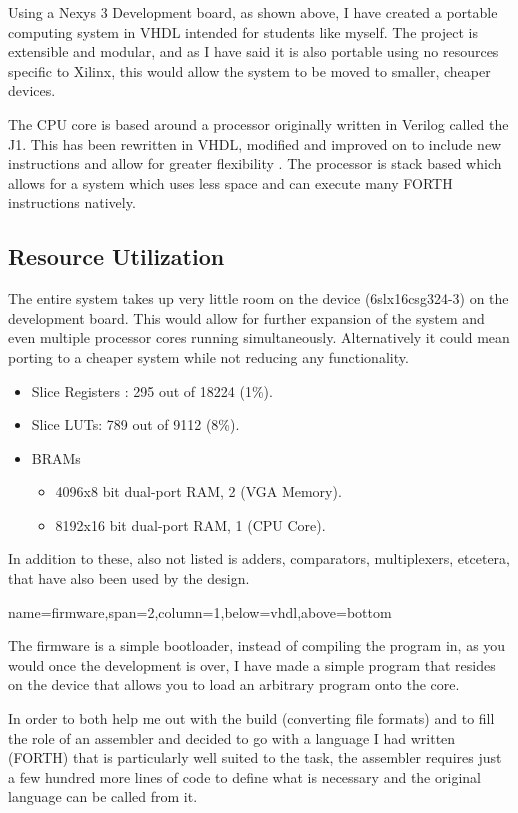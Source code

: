 \documentclass[a1paper,portrait]{baposter}
\begin{document}
\begin{poster}
{Using a Nexys 3 Development board\cite{nexysDigilent}, as shown above,
I have created a portable computing system in VHDL intended for students
like myself. The project is extensible and modular, and as I have said
it is also portable using no resources specific to Xilinx, this would
allow the system to be moved to smaller, cheaper devices.

The CPU core is based around a processor originally written in Verilog
called the J1\cite{j1core}. This has been rewritten in VHDL, modified
and improved on to include new instructions and allow for greater
flexibility . The processor is stack based which allows for a system which uses
less space and can execute many FORTH instructions natively.

\subsection{Resource Utilization}
The entire system takes up very little room on the device (6slx16csg324-3)
on the development board. This would allow for further expansion of
the system and even multiple processor cores running simultaneously. Alternatively
it could mean porting to a cheaper system while not reducing any functionality.
\begin{center}
    \begin{itemize}
        \item Slice Registers : 295 out of 18224 (1\%).
        \item Slice LUTs: 789 out of 9112 (8\%).
        \item BRAMs 
            \begin{itemize}
                \item 4096x8 bit dual-port RAM, 2 (VGA Memory).
                \item 8192x16 bit dual-port RAM, 1 (CPU Core).
            \end{itemize}
    \end{itemize}
\end{center}

In addition to these, also not listed is adders, comparators, multiplexers, etcetera,
that have also been used by the design.
}

{name=firmware,span=2,column=1,below=vhdl,above=bottom}{
\smaller

The firmware is a simple bootloader, instead of compiling the program in, as you would
once the development is over, I have made a simple program that resides on the device
that allows you to load an arbitrary program onto the core. 

In order to both help me out with the build (converting file formats) and to fill the
role of an assembler and decided to go with a language I had written (FORTH) that is particularly
well suited to the task, the assembler requires just a few hundred more lines of code
to define what is necessary and the original language can be called from it.

}

\end{poster}
\end{document}
